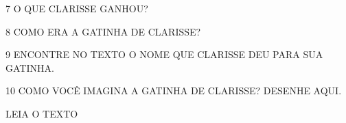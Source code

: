 \num{7} O QUE CLARISSE GANHOU?


\num{8} COMO ERA A GATINHA DE CLARISSE?


\num{9} ENCONTRE NO TEXTO O NOME QUE CLARISSE DEU PARA SUA GATINHA.


\num{10} COMO VOCÊ IMAGINA A GATINHA DE CLARISSE? DESENHE AQUI.

\begin{mdframed}[linewidth=2pt,linecolor=salmao,roundcorner=2pt]
\vspace{3cm}
\end{mdframed}

LEIA O TEXTO


